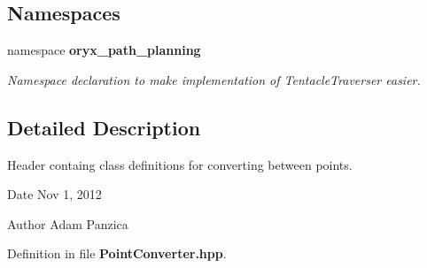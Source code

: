 \subsection*{\-Namespaces}
\begin{DoxyCompactItemize}
\item 
namespace {\bf oryx\-\_\-path\-\_\-planning}
\begin{DoxyCompactList}\small\item\em \-Namespace declaration to make implementation of \-Tentacle\-Traverser easier. \end{DoxyCompactList}\end{DoxyCompactItemize}


\subsection{\-Detailed \-Description}
\-Header containg class definitions for converting between points. \begin{DoxyDate}{\-Date}
\-Nov 1, 2012 
\end{DoxyDate}
\begin{DoxyAuthor}{\-Author}
\-Adam \-Panzica 
\end{DoxyAuthor}


\-Definition in file {\bf \-Point\-Converter.\-hpp}.

